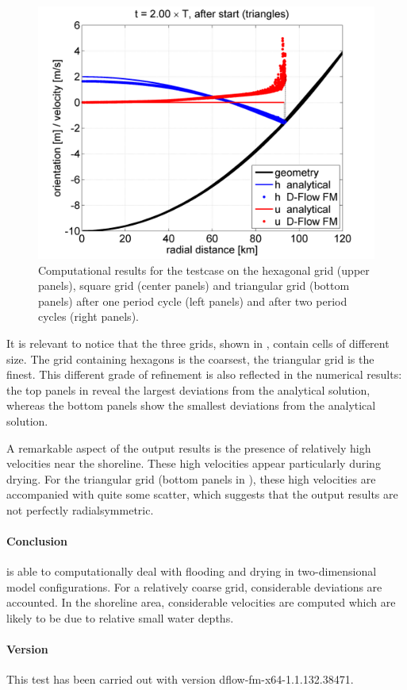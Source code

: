 \begin{figure}[h!]
\begin{center}
\includegraphics[width=0.48\columnwidth]{../../c045_thacker2d_triangles/doc/figures/thacker2dtrianglesT2.png}
\end{center}\caption{Computational results for the testcase on the hexagonal grid (upper panels), square grid (center panels) and triangular grid (bottom panels) after one period cycle (left panels) and after two period cycles (right panels). \label{fig:thacker2dresults}}
\end{figure}

It is relevant to notice that the three grids, shown in , contain cells of different size. The grid containing hexagons is the coarsest, the triangular grid is the finest. This different grade of refinement is also reflected in the numerical results: the top panels in  reveal the largest deviations from the analytical solution, whereas the bottom panels show the smallest deviations from the analytical solution.

A remarkable aspect of the output results is the presence of relatively high velocities near the shoreline. These high velocities appear particularly during drying. For the triangular grid (bottom panels in ), these high velocities are accompanied with quite some scatter, which suggests that the output results are not perfectly radialsymmetric.




\paragraph*{Conclusion}
\DFLOWFM is able to computationally deal with flooding and drying in two-dimensional model configurations. For a relatively coarse grid, considerable deviations are accounted. In the shoreline area, considerable velocities are computed which are likely to be due to relative small water depths.



\paragraph*{Version}
This test has been carried out with version dflow-fm-x64-1.1.132.38471.


